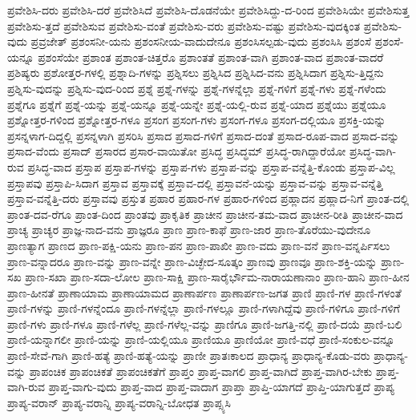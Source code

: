 {ಪ್ರವೇಶಿಸಿ-ದರು
ಪ್ರವೇಶಿಸಿ-ದರೆ
ಪ್ರವೇಶಿಸಿದೆ
ಪ್ರವೇಶಿಸಿ-ದೊಡನೆಯೇ
ಪ್ರವೇಶಿಸಿದ್ದು-ದ-ರಿಂದ
ಪ್ರವೇಶಿಸಿಯೇ
ಪ್ರವೇಶಿಸುತ್ತ
ಪ್ರವೇಶಿಸು-ತ್ತದೆ
ಪ್ರವೇಶಿಸುವ
ಪ್ರವೇಶಿಸು-ವಂತೆ
ಪ್ರವೇಶಿಸು-ವರು
ಪ್ರವೇಶಿಸು-ವಷ್ಟು
ಪ್ರವೇಶಿಸು-ವುದಕ್ಕಿಂತ
ಪ್ರವೇಶಿಸು-ವುದು
ಪ್ರವ್ರಜೇತ್
ಪ್ರಶಂಸನೀ-ಯನು
ಪ್ರಶಂಸನೀಯ-ವಾದುದೇನೂ
ಪ್ರಶಂಸಿಸಲ್ಪಡು-ವುದು
ಪ್ರಶಂಸಿಸಿ
ಪ್ರಶಂಸೆ
ಪ್ರಶಂಸೆ-ಯನ್ನೂ
ಪ್ರಶಂಸೆಯೇ
ಪ್ರಶಾಂತ
ಪ್ರಶಾಂತ-ಚಿತ್ತರೊ
ಪ್ರಶಾಂತತೆ
ಪ್ರಶಾಂತ-ವಾಗಿ
ಪ್ರಶಾಂತ-ವಾದ
ಪ್ರಶಾಂತ-ವಾದರೆ
ಪ್ರಶಿಷ್ಯರು
ಪ್ರಶೋತ್ತರ-ಗಳಲ್ಲಿ
ಪ್ರಶ್ನಾದಿ-ಗಳನ್ನು
ಪ್ರಶ್ನಿಸಲು
ಪ್ರಶ್ನಿಸಿದ
ಪ್ರಶ್ನಿಸಿದ-ವನು
ಪ್ರಶ್ನಿಸಿದಾಗ
ಪ್ರಶ್ನಿಸು-ತ್ತಿದ್ದನು
ಪ್ರಶ್ನಿಸು-ವುದನ್ನು
ಪ್ರಶ್ನಿಸು-ವುದ-ರಿಂದ
ಪ್ರಶ್ನೆ
ಪ್ರಶ್ನೆ-ಗಳನ್ನು
ಪ್ರಶ್ನೆ-ಗಳನ್ನೆಲ್ಲಾ
ಪ್ರಶ್ನೆ-ಗಳಿಗೆ
ಪ್ರಶ್ನೆ-ಗಳು
ಪ್ರಶ್ನೆ-ಗಳೆಂದು
ಪ್ರಶ್ನೆಗೂ
ಪ್ರಶ್ನೆಗೆ
ಪ್ರಶ್ನೆ-ಯನ್ನು
ಪ್ರಶ್ನೆ-ಯನ್ನೂ
ಪ್ರಶ್ನೆ-ಯನ್ನೇ
ಪ್ರಶ್ನೆ-ಯಲ್ಲಿ-ರುವ
ಪ್ರಶ್ನೆ-ಯಾದ
ಪ್ರಶ್ನೆಯು
ಪ್ರಶ್ನೆಯೂ
ಪ್ರಶ್ನೋತ್ತರ-ಗಳಿಂದ
ಪ್ರಶ್ನೋತ್ತರ-ಗಳೂ
ಪ್ರಸಂಗ
ಪ್ರಸಂಗ-ಗಳು
ಪ್ರಸಂಗ-ಗಳೂ
ಪ್ರಸಂಗ-ದಲ್ಲಿಯೂ
ಪ್ರಸಕ್ತಿ-ಯನ್ನು
ಪ್ರಸನ್ನಳಾಗ-ದಿದ್ದಲ್ಲಿ
ಪ್ರಸನ್ನಳಾಗಿ
ಪ್ರಸರಿಸಿ
ಪ್ರಸಾದ
ಪ್ರಸಾದ-ಗಳಿಗೆ
ಪ್ರಸಾದ-ದಂತೆ
ಪ್ರಸಾದ-ರೂಪ-ವಾದ
ಪ್ರಸಾದ-ವನ್ನು
ಪ್ರಸಾದ-ವೆಂದು
ಪ್ರಸಾದ್
ಪ್ರಸಾರದ
ಪ್ರಸಾರ-ವಾಯಿತೋ
ಪ್ರಸಿದ್ಧ
ಪ್ರಸಿದ್ಧಮ್
ಪ್ರಸಿದ್ಧ-ರಾಗಿದ್ದಾರೆಯೋ
ಪ್ರಸಿದ್ಧ-ವಾಗಿ-ರುವ
ಪ್ರಸಿದ್ಧ-ವಾದ
ಪ್ರಸ್ತಾಪ
ಪ್ರಸ್ತಾಪ-ಗಳನ್ನು
ಪ್ರಸ್ತಾಪ-ಗಳು
ಪ್ರಸ್ತಾಪ-ವನ್ನು
ಪ್ರಸ್ತಾಪ-ವನ್ನೆತ್ತಿ-ಕೊಂಡು
ಪ್ರಸ್ತಾಪ-ವಿಲ್ಲ
ಪ್ರಸ್ತಾಪವು
ಪ್ರಸ್ತಾಪಿ-ಸಿದಾಗ
ಪ್ರಸ್ತಾವ
ಪ್ರಸ್ತಾವಕ್ಕೆ
ಪ್ರಸ್ತಾವ-ದಲ್ಲಿ
ಪ್ರಸ್ತಾವನೆ-ಯನ್ನು
ಪ್ರಸ್ತಾವ-ವನ್ನು
ಪ್ರಸ್ತಾವ-ವನ್ನೆತ್ತಿ
ಪ್ರಸ್ತಾವ-ವನ್ನೆತ್ತಿ-ದರು
ಪ್ರಸ್ತಾವವು
ಪ್ರಸ್ತುತ
ಪ್ರಹಾರ
ಪ್ರಹಾರ-ಗಳ
ಪ್ರಹಾರ-ಗಳಿಂದ
ಪ್ರಹ್ಲಾದನ
ಪ್ರಹ್ಲಾದ-ನಿಗೆ
ಪ್ರಾಂತ-ದಲ್ಲಿ
ಪ್ರಾಂತ-ದವ-ರೆಗೂ
ಪ್ರಾಂತ-ದಿಂದ
ಪ್ರಾಂತವು
ಪ್ರಾಕೃತಿಕ
ಪ್ರಾಚೀನ
ಪ್ರಾಚೀನ-ತಮ-ವಾದ
ಪ್ರಾಚೀನ-ರೀತಿ
ಪ್ರಾಚೀನ-ವಾದ
ಪ್ರಾಚ್ಯ
ಪ್ರಾಚ್ಯರ
ಪ್ರಾಜ್ಞ-ನಾದ-ವನು
ಪ್ರಾಜ್ಞರೂ
ಪ್ರಾಣ
ಪ್ರಾಣ-ಕಾಫೆ
ಪ್ರಾಣ-ಜಾರ
ಪ್ರಾಣ-ತೊರೆಯು-ವುದೇನೂ
ಪ್ರಾಣತ್ಯಾಗ
ಪ್ರಾಣದ
ಪ್ರಾಣ-ಪಕ್ಷಿ-ಯನು
ಪ್ರಾಣ-ಪನ
ಪ್ರಾಣ-ಪಾಖೀ
ಪ್ರಾಣ-ವದು
ಪ್ರಾಣ-ವನೆ
ಪ್ರಾಣ-ವನ್ನರ್ಪಿಸಲು
ಪ್ರಾಣ-ವನ್ನಾದರೂ
ಪ್ರಾಣ-ವನ್ನು
ಪ್ರಾಣ-ವನ್ನೇ
ಪ್ರಾಣ-ವಿಚ್ಛೇದ-ಸೂತ್ಕಂ
ಪ್ರಾಣವು
ಪ್ರಾಣವೂ
ಪ್ರಾಣ-ಶಕ್ತಿ-ಯನ್ನು
ಪ್ರಾಣ-ಸಖ
ಪ್ರಾಣ-ಸಖಾ
ಪ್ರಾಣ-ಸದಾ-ಲೋಲ
ಪ್ರಾಣ-ಸಾಕ್ಷಿ
ಪ್ರಾಣ-ಸಾರೈರ್ಭೌಮ-ನಾರಾಯಣಾನಾಂ
ಪ್ರಾಣ-ಹಾನಿ
ಪ್ರಾಣ-ಹೀನ
ಪ್ರಾಣ-ಹೀನತೆ
ಪ್ರಾಣಾಯಾಮ
ಪ್ರಾಣಾಯಾಮದ
ಪ್ರಾಣಾರ್ಪಣ
ಪ್ರಾಣಾರ್ಪಣ-ಜಗತ
ಪ್ರಾಣಿ
ಪ್ರಾಣಿ-ಗಳ
ಪ್ರಾಣಿ-ಗಳಂತೆ
ಪ್ರಾಣಿ-ಗಳನ್ನು
ಪ್ರಾಣಿ-ಗಳನ್ನೆಂದೂ
ಪ್ರಾಣಿ-ಗಳನ್ನೆಲ್ಲಾ
ಪ್ರಾಣಿ-ಗಳಲ್ಲೂ
ಪ್ರಾಣಿ-ಗಳಾಗಿದ್ದೆವು
ಪ್ರಾಣಿ-ಗಳಿಗೂ
ಪ್ರಾಣಿ-ಗಳಿಗೆ
ಪ್ರಾಣಿ-ಗಳು
ಪ್ರಾಣಿ-ಗಳೂ
ಪ್ರಾಣಿ-ಗಳೆಲ್ಲ
ಪ್ರಾಣಿ-ಗಳೆಲ್ಲ-ವನ್ನು
ಪ್ರಾಣಿಗೂ
ಪ್ರಾಣಿ-ಜಗತ್ತಿ-ನಲ್ಲಿ
ಪ್ರಾಣಿ-ದಯೆ
ಪ್ರಾಣಿ-ಬಲಿ
ಪ್ರಾಣಿ-ಯನ್ನಾಗಲೀ
ಪ್ರಾಣಿ-ಯನ್ನು
ಪ್ರಾಣಿ-ಯಲ್ಲಿಯೂ
ಪ್ರಾಣಿಯೂ
ಪ್ರಾಣಿಯೋ
ಪ್ರಾಣಿ-ವಧೆ
ಪ್ರಾಣಿ-ಸಂಕುಲ-ವನ್ನೂ
ಪ್ರಾಣಿ-ಸೇವೆ-ಗಾಗಿ
ಪ್ರಾಣಿ-ಹತ್ಯೆ
ಪ್ರಾಣಿ-ಹತ್ಯೆ-ಯನ್ನು
ಪ್ರಾಣೀ
ಪ್ರಾತಃಕಾಲದ
ಪ್ರಾಧಾನ್ಯ
ಪ್ರಾಧಾನ್ಯ-ಕೊಡು-ವರು
ಪ್ರಾಧಾನ್ಯ-ವನ್ನು
ಪ್ರಾಪಂಚಿಕ
ಪ್ರಾಪಂಚಿಕತೆ
ಪ್ರಾಪಂಚಿಕತೆಗೆ
ಪ್ರಾಪ್ತಂ
ಪ್ರಾಪ್ತ-ವಾಗಲಿ
ಪ್ರಾಪ್ತ-ವಾಗಿದೆ
ಪ್ರಾಪ್ತ-ವಾಗಿರ-ಬೇಕು
ಪ್ರಾಪ್ತ-ವಾಗಿ-ರುವ
ಪ್ರಾಪ್ತ-ವಾಗು-ವುದು
ಪ್ರಾಪ್ತ-ವಾದ
ಪ್ರಾಪ್ತ-ವಾದಾಗ
ಪ್ರಾಪ್ತಾ
ಪ್ರಾಪ್ತಿ-ಯಾಗದೆ
ಪ್ರಾಪ್ತಿ-ಯಾಗುತ್ತದೆ
ಪ್ರಾಪ್ಯ
ಪ್ರಾಪ್ಯ-ವರಾನ್
ಪ್ರಾಪ್ಯ-ವರಾನ್ನಿ
ಪ್ರಾಪ್ಯ-ವರಾನ್ನಿ-ಬೋಧತ
ಪ್ರಾಪ್ಸ್ಯಸಿ
}
